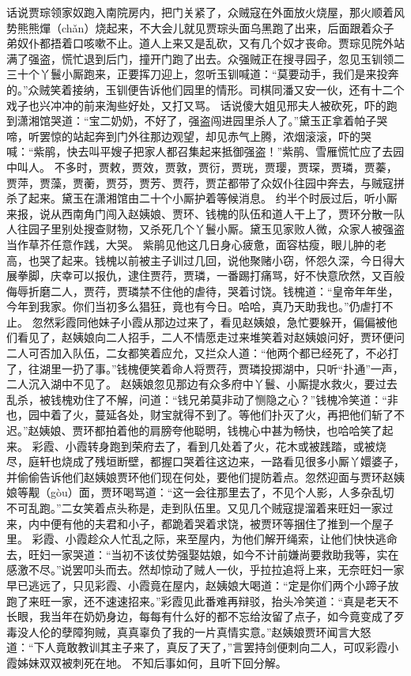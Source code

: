 \documentclass[12pt,oneside]{book}
\begin{document}
话说贾琮领家奴跑入南院房内，把门关紧了，众贼寇在外面放火烧屋，那火顺着风势熊熊燀（chǎn）烧起来，不大会儿就见贾琮头面乌黑跑了出来，后面跟着众子弟奴仆都捂着口咳嗽不止。道人上来又是乱砍，又有几个奴才丧命。贾琮见院外站满了强盗，慌忙退到后门，撞开门跑了出去。众强贼正在搜寻园子，忽见玉钏领二三十个丫鬟小厮跑来，正要挥刀迎上，忽听玉钏喊道：“莫要动手，我们是来投奔的。”众贼笑着接纳，玉钏便告诉他们园里的情形。司棋同潘又安一伙，还有十二个戏子也兴冲冲的前来淘些好处，又打又骂。
话说傻大姐见邢夫人被砍死，吓的跑到潇湘馆哭道：“宝二奶奶，不好了，强盗闯进园里杀人了。”黛玉正拿着帕子哭啼，听罢惊的站起奔到门外往那边观望，却见赤气上腾，浓烟滚滚，吓的哭喊：“紫鹃，快去叫平嫂子把家人都召集起来抵御强盗！”紫鹃、雪雁慌忙应了去园中叫人。
不多时，贾敕，贾效，贾敦，贾衍，贾珖，贾璎，贾琛，贾璘，贾蓁，贾萍，贾藻，贾蘅，贾芬，贾芳、贾荇，贾芷都带了众奴仆往园中奔去，与贼寇拼杀了起来。黛玉在潇湘馆由二十个小厮护着等候消息。
约半个时辰过后，听小厮来报，说从西南角门闯入赵姨娘、贾环、钱槐的队伍和道人干上了，贾环分散一队人往园子里别处搜查财物，又杀死几个丫鬟小厮。黛玉见家败人微，众家人被强盗当作草芥任意作践，大哭。
紫鹃见他这几日身心疲惫，面容枯瘦，眼儿肿的老高，也哭了起来。钱槐以前被主子训过几回，说他聚赌小窃，怀怨久深，今日得大展拳脚，庆幸可以报仇，逮住贾荇，贾璘，一番踢打痛骂，好不快意欣然，又百般侮辱折磨二人，贾荇，贾璘禁不住他的虐待，哭着讨饶。钱槐道：“皇帝年年坐，今年到我家。你们当初多么猖狂，竟也有今日。哈哈，真乃天助我也。”仍虐打不止。
忽然彩霞同他妹子小霞从那边过来了，看见赵姨娘，急忙要躲开，偏偏被他们看见了，赵姨娘向二人招手，二人不情愿走过来堆笑着对赵姨娘问好，贾环便问二人可否加入队伍，二女都笑着应允，又拦众人道：“他两个都已经死了，不必打了，往湖里一扔了事。”钱槐便笑着命人将贾荇，贾璘投掷湖中，只听“扑通”一声，二人沉入湖中不见了。
赵姨娘忽见那边有众多府中丫鬟、小厮提水救火，要过去乱杀，被钱槐劝住了不解，问道：“钱兄弟莫非动了恻隐之心？”钱槐冷笑道：“非也，园中着了火，蔓延各处，财宝就得不到了。等他们扑灭了火，再把他们斩了不迟。”赵姨娘、贾环都拍着他的肩膀夸他聪明，钱槐心中甚为畅快，也哈哈笑了起来。
彩霞、小霞转身跑到荣府去了，看到几处着了火，花木或被践踏，或被烧尽，庭轩也烧成了残垣断壁，都握口哭着往这边来，一路看见很多小厮丫嬛婆子，并偷偷告诉他们赵姨娘贾环他们现在何处，要他们提防着点。忽然迎面与贾环赵姨娘等觏（gòu）面，贾环喝骂道：“这一会往那里去了，不见个人影，人多杂乱切不可乱跑。”二女笑着点头称是，走到队伍里。又见几个贼寇提溜着来旺妇一家过来，内中便有他的夫君和小子，都跪着哭着求饶，被贾环等捆住了推到一个屋子里。
彩霞、小霞趁众人忙乱之际，来至屋内，为他们解开绳索，让他们快快逃命去，旺妇一家哭道：“当初不该仗势强娶姑娘，如今不计前嫌尚要救助我等，实在感激不尽。”说罢叩头而去。然却惊动了贼人一伙，乎拉拉追将上来，无奈旺妇一家早已逃远了，只见彩霞、小霞竟在屋内，赵姨娘大喝道：“定是你们两个小蹄子放跑了来旺一家，还不速速招来。”彩霞见此番难再辩驳，抬头冷笑道：“真是老天不长眼，我当年在奶奶身边，每每有什么好的都不忘给汝留了点子，如今竟变成了歹毒没人伦的孽障狗贼，真真辜负了我的一片真情实意。”赵姨娘贾环闻言大怒道：“下人竟敢教训其主子来了，真反了天了，”言罢持剑便刺向二人，可叹彩霞小霞姊妹双双被刺死在地。
不知后事如何，且听下回分解。
 
\end{document}

